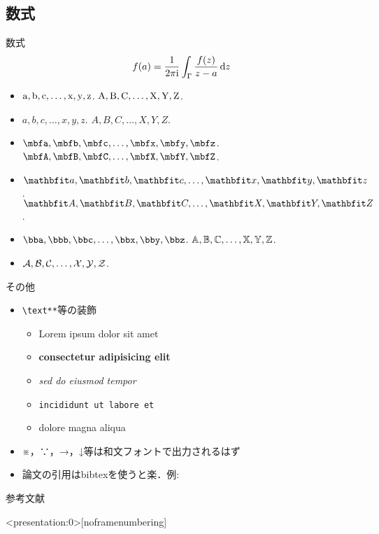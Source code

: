\documentclass[unicode]{beamer}
\begin{document}
  \subsection{数式}
  \begin{frame}{数式}
    \begin{align}
      f(a) = \frac{1}{2\pi\mathrm{i}} \int_\Gamma \frac{f(z)}{z-a} \dd{z}
    \end{align}
    \begin{itemize}
      \item $\mathrm{a},\mathrm{b},\mathrm{c},\dots,\mathrm{x},\mathrm{y},\mathrm{z}$. $\mathrm{A},\mathrm{B},\mathrm{C},\dots,\mathrm{X},\mathrm{Y},\mathrm{Z}$.
      \item $a,b,c,\dots,x,y,z$. $A,B,C,\dots,X,Y,Z$.
      \item $\bfa,\bfb,\bfc,\dots,\bfx,\bfy,\bfz$. $\bfA,\bfB,\bfC,\dots,\bfX,\bfY,\bfZ$.
      \item $\bma,\bmb,\bmc,\dots,\bmx,\bmy,\bmz$. $\bmA,\bmB,\bmC,\dots,\bmX,\bmY,\bmZ$.
      \item $\bba,\bbb,\bbc,\dots,\bbx,\bby,\bbz$. $\mathbb{A},\mathbb{B},\mathbb{C},\dots,\mathbb{X},\mathbb{Y},\mathbb{Z}$.
      \item $\mathcal{A},\mathcal{B},\mathcal{C},\dots,\mathcal{X},\mathcal{Y},\mathcal{Z}$.
    \end{itemize}
  \end{frame}


  \begin{frame}{その他}
    \begin{itemize}
      \item \texttt{\textbackslash text**}等の装飾
      \begin{itemize}
        \item Lorem ipsum dolor sit amet
        \item \textbf{consectetur adipisicing elit}
        \item \textit{sed do eiusmod tempor}
        \item \texttt{incididunt ut labore et}
        \item \alert{dolore magna aliqua}
      \end{itemize}
      \item ※，∵，→，↓等は和文フォントで出力されるはず
      \item 論文の引用はbibtexを使うと楽．例: \cite{MR3642670}
    \end{itemize}
  \end{frame}


\appendix
  \begin{frame}[t,allowframebreaks]{参考文献}
    \scriptsize
    
    
  \end{frame}

  \begin{frame}<presentation:0>[noframenumbering]
    \cite{MR3642670}
  \end{frame}
\end{document}
